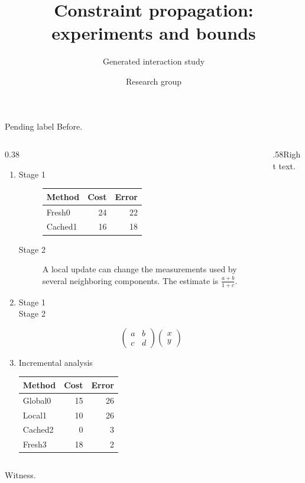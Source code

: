 \documentclass[11pt,aspectratio=43]{beamer}
\title{Constraint propagation: experiments and bounds}
\subtitle{Generated interaction study}
\author{Research group}
\date{}
\begin{document}
\begin{frame}[t,shrink=5]{Pending label}
Before.\par\begin{columns}[onlytextwidth,c]\begin{column}{0.38\textwidth}
\begin{enumerate}
\item<1-> \begin{description}
\item[Stage 1] \begin{tabular}{lrr}Method&Cost&Error\\\hline
Fresh0&24&22\\
Cached1&16&18\\
\end{tabular}
\item[Stage 2] \textrm{A local update} can change the measurements used by several neighboring components.  The estimate is $\frac{a+b}{1+c}$.
\end{description}
\item<2-> \begin{description}
\item[Stage 1] 
\item[Stage 2] \[\begin{pmatrix}a&b\\c&d\end{pmatrix}\begin{pmatrix}x\\y\end{pmatrix}\]
\end{description}
\item<3-> \begin{exampleblock}{Incremental analysis}
\begin{tabular}{lrr}Method&Cost&Error\\\hline
Global0&15&26\\
Local1&10&26\\
Cached2&0&3\\
Fresh3&18&2\\
\end{tabular}
\end{exampleblock}
\end{enumerate}
\end{column}\begin{column}{.58\textwidth}Right text.\end{column}\end{columns}\par Witness.\end{frame}
\end{document}
